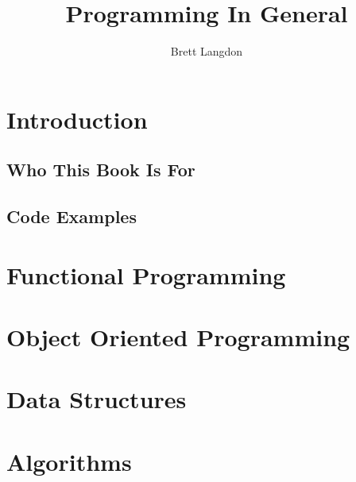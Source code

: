 \documentclass[10pt,a4paper,titlepage]{book}
\author{Brett Langdon}
\title{Programming In General}
\begin{document}
\maketitle
\tableofcontents

\chapter{Introduction}


\section{Who This Book Is For}


\section{Code Examples}


\chapter{Functional Programming}


\chapter{Object Oriented Programming}

\chapter{Data Structures}

\chapter{Algorithms}
\end{document}
